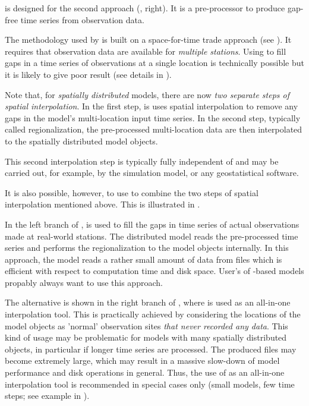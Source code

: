  is designed for the second approach (, right). It is a pre-processor to produce gap-free time series from observation data.

The methodology used by  is built on a space-for-time trade approach (see ). It requires that observation data are available for \emph{multiple stations}. Using  to fill gaps in a time series of observations at a single location is technically possible but it is likely to give poor result (see details in ).

Note that, for \emph{spatially distributed} models, there are now \emph{two separate steps of spatial interpolation}. In the first step,  is uses spatial interpolation to remove any gaps in the model's multi-location input time series. In the second step, typically called regionalization, the pre-processed multi-location data are then interpolated to the spatially distributed model objects.

This second interpolation step is typically fully independent of  and may be carried out, for example, by the simulation model, or any geostatistical software.

It is also possible, however, to use  to combine the two steps of spatial interpolation mentioned above. This is illustrated in .

In the left branch of ,  is used to fill the gaps in time series of actual observations made at real-world stations. The distributed model reads the pre-processed time series and performs the regionalization to the model objects internally. In this approach, the model reads a rather small amount of data from files which is efficient with respect to computation time and disk space. User's of -based models propably always want to use this approach.

The alternative is shown in the right branch of , where  is used as an all-in-one interpolation tool. This is practically achieved by considering the locations of the model objects as 'normal' observation sites \emph{that never recorded any data}. This kind of usage may be problematic for models with many spatially distributed objects, in particular if longer time series are processed. The produced files may become extremely large, which may result in a massive slow-down of model performance and disk operations in general. Thus, the use of  as an all-in-one interpolation tool is recommended in special cases only (small models, few time steps; see example in ).

